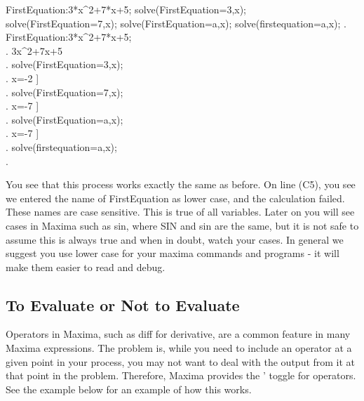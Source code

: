 \vspace{3ex}

\label{Labeling an Equation (Example 5)}

\beginmaximasession
FirstEquation:3*x^2+7*x+5;
solve(FirstEquation=3,x);
solve(FirstEquation=7,x);
solve(FirstEquation=a,x);
solve(firstequation=a,x);
\maximatexsession
{}.  FirstEquation:3*x^2+7*x+5; \\
.   3\*x^{2}+7\*x+5 \\
.  solve(FirstEquation=3,x); \\
.   \left[ x=-{{1}\over{3}},\linebreak[0]x=-2 \right]  \\
.  solve(FirstEquation=7,x); \\
.   \left[ x=-{{\sqrt{73}+7}\over{6}},\linebreak[0]x={{-7
 }} \right]  \\
.  solve(FirstEquation=a,x); \\
.   \left[ x=-{{\sqrt{12\*a-11}+7}\over{6}},\linebreak[0]x={{-7}} \right]  \\
.  solve(firstequation=a,x); \\
.   \left[  \right]  \\
\endmaximasession

\vspace{3ex}

You see that this process works exactly the same as before. On line
(C5), you see we entered the name of FirstEquation as lower case,
and the calculation failed. These names are case sensitive. This is
true of all variables. Later on you will see cases in Maxima such
as sin, where SIN and sin are the same, but it is not safe to assume
this is always true and when in doubt, watch your cases. In general 
we suggest you use lower case for your maxima commands and programs - 
it will make them easier to read and debug.


\subsection{To Evaluate or Not to Evaluate}

Operators in Maxima, such as diff for derivative, are a common feature
in many Maxima expressions. The problem is, while you need to include
an operator at a given point in your process, you may not want to
deal with the output from it at that point in the problem. Therefore,
Maxima provides the ' toggle for operators. See the example below
for an example of how this works.

